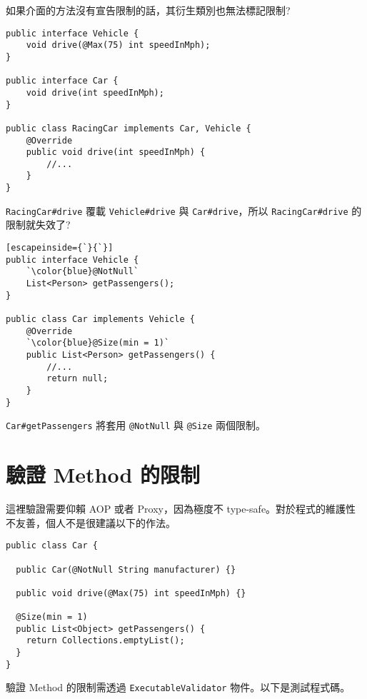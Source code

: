 {\color{red}如果介面的方法沒有宣告限制的話，其衍生類別也無法標記限制?}

\begin{lstlisting}
public interface Vehicle {
    void drive(@Max(75) int speedInMph);
}

public interface Car {
    void drive(int speedInMph);
}

public class RacingCar implements Car, Vehicle {
    @Override
    public void drive(int speedInMph) {
        //...
    }
}
\end{lstlisting}

{\color{red}\texttt{RacingCar\#drive} 覆載 \texttt{Vehicle\#drive} 與 \texttt{Car\#drive}，所以 \texttt{RacingCar\#drive} 的限制就失效了?}

\begin{lstlisting}[escapeinside={`}{`}]
public interface Vehicle {
    `\color{blue}@NotNull`
    List<Person> getPassengers();
}

public class Car implements Vehicle {
    @Override
    `\color{blue}@Size(min = 1)`
    public List<Person> getPassengers() {
        //...
        return null;
    }
}
\end{lstlisting}

\texttt{Car\#getPassengers} 將套用 \texttt{@NotNull} 與 \texttt{@Size} 兩個限制。

\section{驗證 Method 的限制}

這裡驗證需要仰賴 AOP 或者 Proxy，因為極度不 type-safe。對於程式的維護性不友善，個人不是很建議以下的作法。

\begin{lstlisting}
public class Car {

  public Car(@NotNull String manufacturer) {}

  public void drive(@Max(75) int speedInMph) {}

  @Size(min = 1)
  public List<Object> getPassengers() {
    return Collections.emptyList();
  }
}
\end{lstlisting}

驗證 Method 的限制需透過 \texttt{ExecutableValidator} 物件。以下是測試程式碼。

